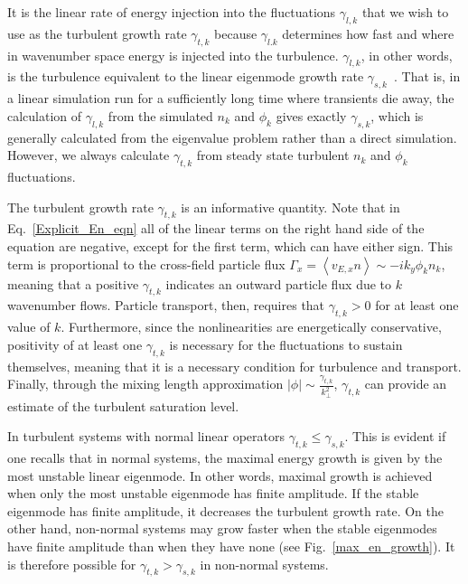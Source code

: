 \documentclass[twocolumn,showkeys,superscriptaddress]{revtex4}
\begin{document}
It is the linear rate of energy injection into the fluctuations $\gamma_{l,k}$ that we wish to use as the turbulent growth rate $\gamma_{t,k}$ because $\gamma_{l.k}$
determines how fast and where in wavenumber space energy is injected into the turbulence.
$\gamma_{l,k}$, in other words, is the turbulence equivalent to the linear eigenmode growth rate $\gamma_{s,k}$~\cite{friedman2012b,terry2006b}. 
That is, in a linear simulation run for a sufficiently long time where transients die away, the calculation of $\gamma_{l,k}$ from the simulated $n_k$ and $\phi_k$ gives exactly $\gamma_{s,k}$, which is generally
calculated from the eigenvalue problem rather than a direct simulation.
However, we always calculate $\gamma_{t,k}$ from steady state turbulent $n_k$ and $\phi_k$ fluctuations.

The turbulent growth rate $\gamma_{t,k}$ is an informative quantity. 
Note that in Eq.~\ref{Explicit_En_eqn} all of the linear terms on the right hand side of the equation are negative, except for the first term, which can have either sign. 
This term is proportional to the cross-field particle flux $\Gamma_x = \left< v_{E,x} n \right> \sim -i k_y \phi_k n_k$, meaning that a positive $\gamma_{t,k}$ indicates an outward particle flux
due to $k$ wavenumber flows. Particle transport, then, requires that $\gamma_{t,k} > 0$ for at least one value of $k$. Furthermore, since the nonlinearities are energetically conservative,
positivity of at least one $\gamma_{t,k}$ is necessary for the fluctuations to sustain themselves, meaning that it is a necessary condition for turbulence and transport. 
Finally, through the mixing length approximation $|\phi| \sim \frac{\gamma_{t,k}}{k_\perp^2}$, $\gamma_{t,k}$ can provide an estimate of the turbulent saturation level.

In turbulent systems with normal linear operators $\gamma_{t,k} \le \gamma_{s,k}$. This is evident if one recalls that in normal systems, the maximal
energy growth is given by the most unstable linear eigenmode. In other words, maximal growth is achieved when only the most unstable eigenmode has finite amplitude.
If the stable eigenmode has finite amplitude, it decreases the turbulent growth rate.
On the other hand, non-normal systems may grow faster when the stable eigenmodes have finite amplitude than when they have none (see Fig.~\ref{max_en_growth}). 
It is therefore possible for $\gamma_{t,k} > \gamma_{s,k}$ in non-normal systems.
\end{document}
